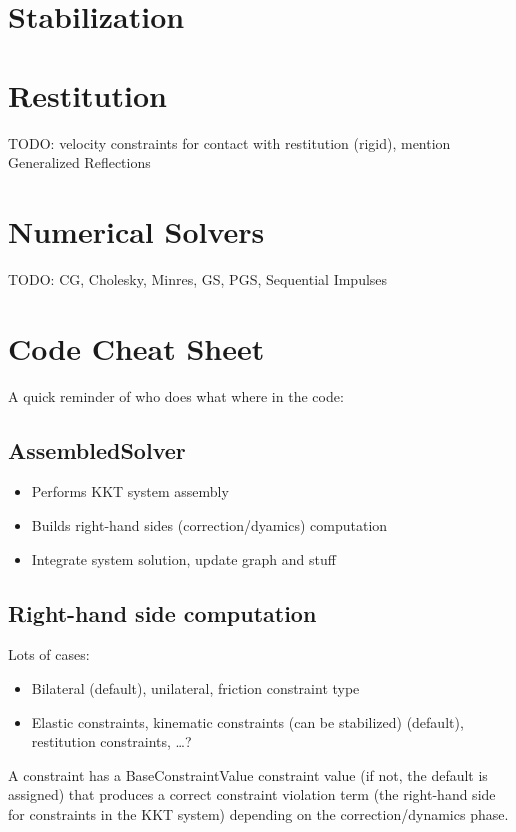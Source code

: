 \documentclass{article}
\begin{document}
\section{Stabilization}
%

\section{Restitution}
%
TODO: velocity constraints for contact with restitution (rigid),
mention Generalized Reflections
%
\section{Numerical Solvers}
\label{sec:solvers}
%
TODO: CG, Cholesky, Minres, GS, PGS, Sequential Impulses


\section{Code Cheat Sheet}

A quick reminder of who does what where in the code:

\subsection{AssembledSolver}

\begin{itemize}
\item Performs KKT system assembly
\item Builds right-hand sides (correction/dyamics) computation
\item Integrate system solution, update graph and stuff
\end{itemize}

\subsection{Right-hand side computation}

Lots of cases:
\begin{itemize}
\item Bilateral (default), unilateral, friction constraint type
\item Elastic constraints, kinematic constraints (can be stabilized) (default), restitution constraints, \ldots ?
\end{itemize}

A constraint has a BaseConstraintValue constraint value (if not, the
default is assigned) that produces a correct constraint violation term
(the right-hand side for constraints in the KKT system) depending on
the correction/dynamics phase.
\end{document}
